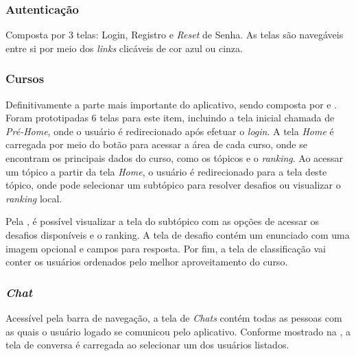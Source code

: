 \subsubsection{Autenticação}

Composta por 3 telas: Login, Registro e \textit{Reset} de Senha. As telas são navegáveis entre si por meio dos \textit{links} clicáveis de cor azul ou cinza.


\subsubsection{Cursos}

Definitivamente a parte mais importante do aplicativo, sendo composta por  e . Foram prototipadas 6 telas para este item, incluindo a tela inicial chamada de \textit{Pré-Home}, onde o usuário é redirecionado após efetuar o \textit{login}. A tela \textit{Home} é carregada por meio do botão para acessar a área de cada curso, onde se encontram os principais dados do curso, como os tópicos e o \textit{ranking}. Ao acessar um tópico a partir da tela \textit{Home}, o usuário é redirecionado para a tela deste tópico, onde pode selecionar um subtópico para resolver desafios ou visualizar o \textit{ranking} local.


Pela , é possível visualizar a tela do subtópico com as opções de acessar os desafios disponíveis e o ranking. A tela de desafio contém um enunciado com uma imagem opcional e campos para resposta. Por fim, a tela de classificação vai conter os usuários ordenados pelo melhor aproveitamento do curso.


\subsubsection{\textit{Chat}}

Acessível pela barra de navegação, a tela de \textit{Chats} contém todas as pessoas com as quais o usuário logado se comunicou pelo aplicativo. Conforme mostrado na , a tela de conversa é carregada ao selecionar um dos usuários listados.

